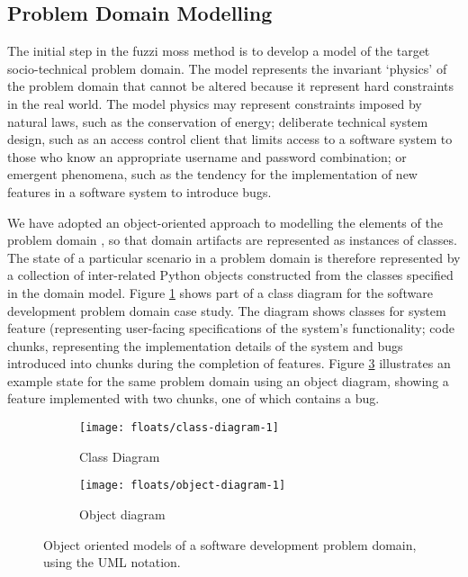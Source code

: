 \documentclass{sig-alternate}
\begin{document}

\subsection{Problem Domain Modelling}


The initial step in the fuzzi moss method is to develop a model of the target
socio-technical problem domain.  The model represents the invariant `physics' of
the problem domain that cannot be altered because it represent hard constraints
in the real world.  The model physics may represent constraints imposed by
natural laws, such as the conservation of energy; deliberate technical system
design, such as an access control client that limits access to a software system
to those who know an appropriate username and password combination; or emergent
phenomena, such as the tendency for the implementation of new features in a
software system to introduce bugs.

We have adopted an object-oriented approach to modelling the elements of the
problem domain \citep{bennett06object}, so that domain artifacts are represented
as instances of classes.  The state of a particular scenario in a problem domain
is therefore represented by a collection of inter-related Python objects
constructed from the classes specified in the domain model.  Figure
\ref{fig:feature-class-diagram} shows part of a class diagram for the software
development problem domain case study.  The diagram shows classes for system
feature (representing user-facing specifications of the system's functionality;
code chunks, representing the implementation details of the system and bugs
introduced into chunks during the completion of features.  Figure
\ref{fig:feature-instance-diagram} illustrates an example state for the same
problem domain using an object diagram, showing a feature implemented with two
chunks, one of which contains a bug.

\begin{figure}
  \centering

  \begin{subfigure}{\linewidth}
    \centering
    \texttt{[image: floats/class-diagram-1]}
    \caption{Class Diagram}
    \label{fig:feature-class-diagram}
  \end{subfigure}

  \begin{subfigure}{\linewidth}
    \centering 
    \texttt{[image: floats/object-diagram-1]}
    \caption{Object diagram}
    \label{fig:feature-instance-diagram}
  
  \end{subfigure}

  
  \caption{Object oriented models of a software development problem domain,
    using the UML notation.}

\end{figure}
\end{document}
